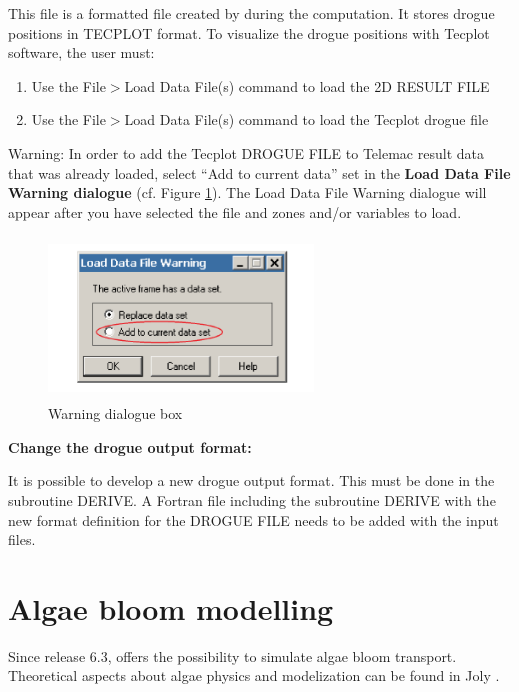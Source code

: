  This file is a formatted file created by  during the computation. It stores drogue positions in TECPLOT format. To visualize the drogue positions with Tecplot software, the user must:

\begin{enumerate}
\item  Use the File$>$Load Data File(s) command to load the 2D RESULT FILE

\item  Use the File$>$Load Data File(s) command to load the Tecplot drogue file
\end{enumerate}

\begin{WarningBlock}{Warning:}
 In order to add the Tecplot DROGUE FILE to Telemac result data that was already loaded, select ``Add to current data'' set in the \textbf{Load Data File Warning dialogue} (cf. Figure \ref{fig:load:df}). The Load Data File Warning dialogue will appear after you have selected the file and zones and/or variables to load.
\end{WarningBlock}
\begin{figure}
\centering
 \includegraphics[width=2.77in, height=1.70in, keepaspectratio=false]{./graphics/warning1.png}
 \caption{Warning dialogue box}%
 \label{fig:load:df}
\end{figure}

 \textbf{Change the drogue output format:}

 It is possible to develop a new drogue output format. This must be done in the subroutine DERIVE. A Fortran file including the subroutine DERIVE with the new format definition for the DROGUE FILE needs to be added with the input files.


\section{ Algae bloom modelling}
\label{sec:algae:bloom}
 Since release 6.3,  offers the possibility to simulate algae bloom transport. Theoretical aspects about algae physics and modelization can be found in Joly \cite{Joly2011}.


